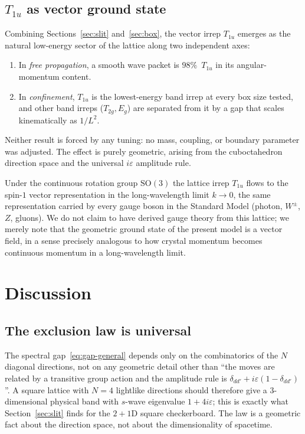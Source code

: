 \documentclass[twocolumn,showpacs,preprintnumbers,amsmath,amssymb]{revtex4-2}
\newcommand{\eps}{\varepsilon}
\begin{document}
\subsection{$T_{1u}$ as vector ground state}

Combining Sections~\ref{sec:slit} and~\ref{sec:box}, the
vector irrep $T_{1u}$ emerges as the natural low-energy sector of the
lattice along two independent axes:
\begin{enumerate}
  \item In \emph{free propagation}, a smooth wave packet is
        $98\%$~$T_{1u}$ in its angular-momentum content.
  \item In \emph{confinement}, $T_{1u}$ is the lowest-energy band
        irrep at every box size tested, and other band irreps
        ($T_{2g},E_{g}$) are separated from it by a gap that scales
        kinematically as $1/L^{2}$.
\end{enumerate}
Neither result is forced by any tuning: no mass, coupling, or
boundary parameter was adjusted.
The effect is purely geometric, arising from the cuboctahedron
direction space and the universal $i\eps$ amplitude rule.

Under the continuous rotation group $\mathrm{SO}(3)$ the lattice
irrep $T_{1u}$ flows to the spin-$1$ vector representation in the
long-wavelength limit $k\to 0$, the same representation carried by
every gauge boson in the Standard Model (photon, $W^\pm$, $Z$,
gluons).
We do not claim to have derived gauge theory from this lattice; we
merely note that the geometric ground state of the present model is
a vector field, in a sense precisely analogous to how crystal momentum
becomes continuous momentum in a long-wavelength limit.

\section{Discussion}
\label{sec:disc}

\subsection{The exclusion law is universal}

The spectral gap~\eqref{eq:gap-general} depends only on the combinatorics
of the $N$ diagonal directions, not on any geometric detail other than
``the moves are related by a transitive group action and the amplitude
rule is $\delta_{dd'}+i\eps(1-\delta_{dd'})$''.
A square lattice with $N=4$ lightlike directions should therefore give a
$3$-dimensional physical band with $s$-wave eigenvalue $1+4i\eps$;
this is exactly what Section~\ref{sec:slit} finds for the
$2{+}1$D square checkerboard.
The law is a geometric fact about the direction space, not about the
dimensionality of spacetime.
\end{document}
